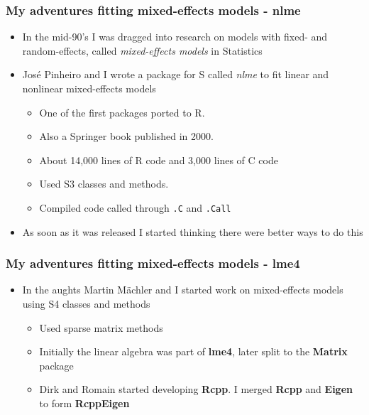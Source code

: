 \documentclass[pdf]{beamer}
\begin{document}
  \begin{frame}\frametitle{My adventures fitting mixed-effects models - nlme}
    \begin{itemize}
      \pause
      \item In the mid-90's I was dragged into research on models with fixed- and random-effects, called \textit{mixed-effects models} in Statistics
      \pause
      \item Jos\'e Pinheiro and I wrote a package for S called \textit{nlme} to fit linear and nonlinear mixed-effects models
      \begin{itemize}
        \pause
        \item One of the first packages ported to R.
        \item Also a Springer book published in 2000.
        \item About 14,000 lines of R code and 3,000 lines of C code
        \item Used S3 classes and methods.
        \item Compiled code called through \texttt{.C} and \texttt{.Call}
      \end{itemize}
      \pause
      \item As soon as it was released I started thinking there were better ways to do this
    \end{itemize}
  \end{frame}

  \begin{frame}\frametitle{My adventures fitting mixed-effects models - lme4}
    \begin{itemize}
      \pause
      \item In the aughts Martin M\"achler and I started work on mixed-effects models using S4 classes and methods
      \begin{itemize}
        \pause
        \item Used sparse matrix methods
        \item Initially the linear algebra was part of \textbf{lme4}, later split to the \textbf{Matrix} package
        \item Dirk and Romain started developing \textbf{Rcpp}.  I merged \textbf{Rcpp} and \textbf{Eigen} to form \textbf{RcppEigen}
      \end{itemize}
      \pause
    \end{itemize}
  \end{frame}
\end{document}
